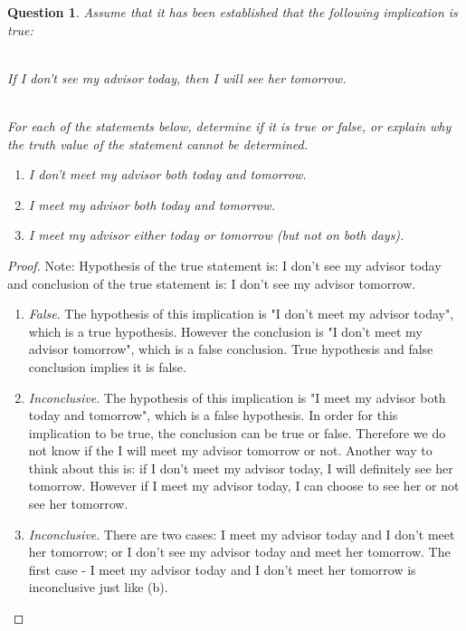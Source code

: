 \documentclass[11pt,oneside]{article}
\newtheorem{question}{Question}
\begin{document}
\begin{question}
    Assume that it has been established that the following implication is true:\\
    \\
    \centerline{If I don't see my advisor today, then I will see her tomorrow.}\
    \\
    For each of the statements below, determine if it is true or false, or explain why the truth value of the statement cannot be determined.
   \begin{enumerate}
   	\item[(a)] I don't meet my advisor both today and tomorrow.
   	\item[(b)] I meet my advisor both today and tomorrow.
   	\item[(c)] I meet my advisor either today or tomorrow (but not on both days).
   \end{enumerate}
\end{question}

\begin{proof}
	Note: Hypothesis of the true statement is: I don't see my advisor today and conclusion of the true statement is: I don't see my advisor tomorrow. \\
    \begin{enumerate}
        \item[(a)] \emph{False}. The hypothesis of this implication is "I don't meet my advisor today", which is a true hypothesis. However the conclusion is "I don't meet my advisor tomorrow", which is a false conclusion. True hypothesis and false conclusion implies it is false.
        \item[(b)] \emph{Inconclusive}. The hypothesis of this implication is "I meet my advisor both today and tomorrow", which is a false hypothesis. In order for this implication to be true, the conclusion can be true or false. Therefore we do not know if the I will meet my advisor tomorrow or not. Another way to think about this is: if I don't meet my advisor today, I will definitely see her tomorrow. However if I meet my advisor today, I can choose to see her or not see her tomorrow.
        \item [(c)] \emph{Inconclusive}. There are two cases: I meet my advisor today and I don't meet her tomorrow; or I don't see my advisor today and meet her tomorrow. The first case - I meet my advisor today and I don't meet her tomorrow is inconclusive just like (b).
    \end{enumerate}
\end{proof}
\end{document}
